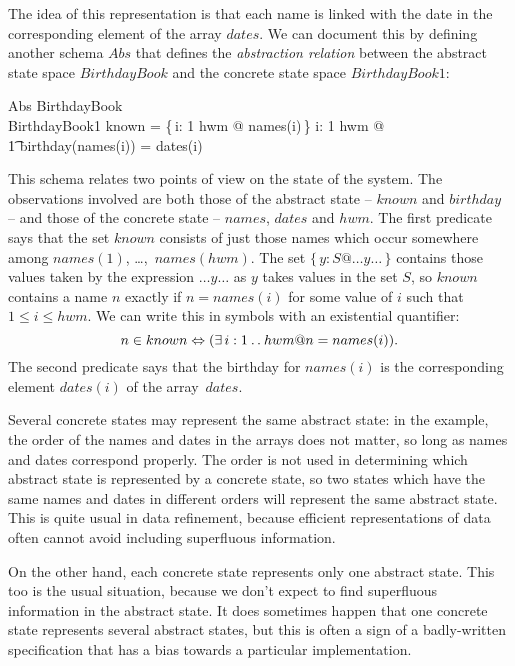 \documentclass[12pt]{article}
\begin{document}
The idea of this representation is that each name is linked with the
date in the corresponding element of the array $dates$. We can
document this by defining another schema $Abs$ that defines the {\em
abstraction relation\/} between the abstract state space
$BirthdayBook$ and the concrete state space $BirthdayBook1$:
\begin{schema}{Abs}
	BirthdayBook \\
	BirthdayBook1
\where
	known = \{\,i: 1 \upto hwm @ names(i)\,\}
\also
	\forall i: 1 \upto hwm @ \\
\t1		birthday(names(i)) = dates(i)
\end{schema}

\noindent This schema relates two points of view on the state of the system.
The observations involved are both those of the abstract state --
$known$ and $birthday$ -- and those of the concrete state -- $names$,
$dates$ and $hwm$.  The first predicate says that the set $known$
consists of just those names which occur somewhere among $names(1)$,
\dots,~$names(hwm)$.
The set $\{\,y: S @ \ldots y \ldots\,\}$ contains those values
taken by the expression $\ldots y \ldots$ as $y$ takes values in the
set $S$, so $known$ contains a name $n$ exactly if $n = names(i)$ for
some value of $i$ such that $1 \leq i \leq hwm$. We can write this in
symbols with an existential quantifier:
\[
	n \in known \iff (\exists i: 1 \upto hwm @ n = names(i)).
\]
The second predicate says that the birthday for $names(i)$ is the
corresponding element $dates(i)$ of the array~$dates$.

Several concrete states may represent the same abstract state: in the
example, the order of the names and dates in the arrays does not
matter, so long as names and dates correspond properly. The order is
not used in determining which abstract state is represented by a
concrete state, so two states which have the same names and dates in
different orders will represent the same abstract state.  This is quite
usual in data refinement, because efficient representations of data
often cannot avoid including superfluous information.

On the other hand, each concrete state represents only one abstract
state.  This too is the usual situation, because we don't expect to
find superfluous information in the abstract state. It does sometimes
happen that one concrete state represents several abstract states, but
this is often a sign of a badly-written specification that has a bias
towards a particular implementation.
\end{document}
